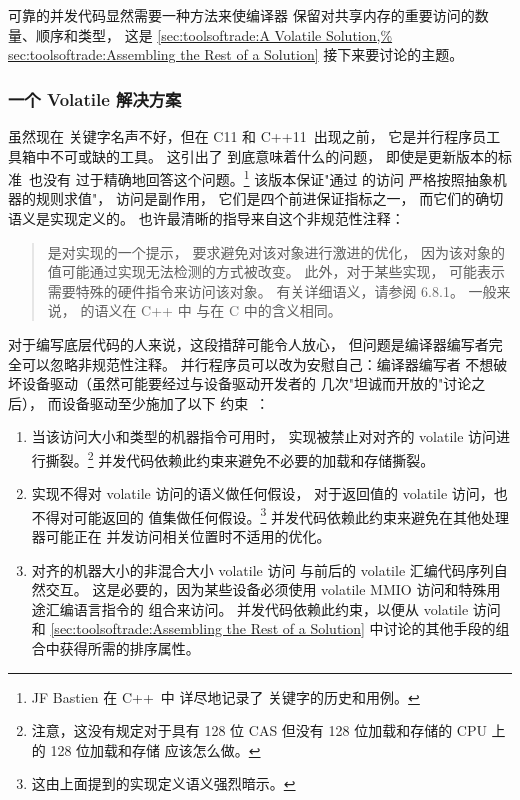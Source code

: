 可靠的并发代码显然需要一种方法来使编译器
保留对共享内存的重要访问的数量、顺序和类型，
这是
\cref{sec:toolsoftrade:A Volatile Solution,%
sec:toolsoftrade:Assembling the Rest of a Solution}
接下来要讨论的主题。

\subsubsection{一个 Volatile 解决方案}
\label{sec:toolsoftrade:A Volatile Solution}

虽然现在  关键字名声不好，但在 C11 和
C++11~\cite{PeteBecker2011N3242}出现之前，
它是并行程序员工具箱中不可或缺的工具。
这引出了  到底意味着什么的问题，
即使是更新版本的标准~\cite{RichardSmith2019N4800}也没有
过于精确地回答这个问题。\footnote{
	JF Bastien 在
	C++~\cite{JFBastien2018DeprecatingVolatile}中
	详尽地记录了  关键字的历史和用例。}
该版本保证"通过   的访问
严格按照抽象机器的规则求值"，
 访问是副作用，
它们是四个前进保证指标之一，
而它们的确切语义是实现定义的。
也许最清晰的指导来自这个非规范性注释：

\begin{quote}
	 是对实现的一个提示，
	要求避免对该对象进行激进的优化，
	因为该对象的值可能通过实现无法检测的方式被改变。
	此外，对于某些实现， 可能表示
	需要特殊的硬件指令来访问该对象。
	有关详细语义，请参阅 6.8.1。
	一般来说， 的语义在 C++ 中
	与在 C 中的含义相同。
\end{quote}

对于编写底层代码的人来说，这段措辞可能令人放心，
但问题是编译器编写者完全可以忽略非规范性注释。
并行程序员可以改为安慰自己：编译器编写者
不想破坏设备驱动（虽然可能要经过与设备驱动开发者的
几次"坦诚而开放的"讨论之后），
而设备驱动至少施加了以下
约束~\cite{PaulEMcKenney2016P0124R6-LKMM}：

\begin{enumerate}
\item	当该访问大小和类型的机器指令可用时，
	实现被禁止对对齐的 volatile 访问进行撕裂。\footnote{
		注意，这没有规定对于具有 128 位 CAS 但没有
		128 位加载和存储的 CPU 上的 128 位加载和存储
		应该怎么做。}
	并发代码依赖此约束来避免不必要的加载和存储撕裂。
\item	实现不得对 volatile 访问的语义做任何假设，
	对于返回值的 volatile 访问，也不得对可能返回的
	值集做任何假设。\footnote{
		这由上面提到的实现定义语义强烈暗示。}
	并发代码依赖此约束来避免在其他处理器可能正在
	并发访问相关位置时不适用的优化。
\item	对齐的机器大小的非混合大小 volatile 访问
	与前后的 volatile 汇编代码序列自然交互。
	这是必要的，因为某些设备必须使用
	volatile MMIO 访问和特殊用途汇编语言指令的
	组合来访问。
	并发代码依赖此约束，以便从 volatile 访问和
	\cref{sec:toolsoftrade:Assembling the Rest of a Solution}
	中讨论的其他手段的组合中获得所需的排序属性。
\end{enumerate}

